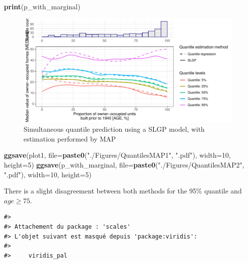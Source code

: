 \documentclass[
]{article}
\newenvironment{Shaded}{\begin{snugshade}}{\end{snugshade}}
\newcommand{\AttributeTok}[1]{\textcolor[rgb]{0.13,0.29,0.53}{#1}}
\newcommand{\DecValTok}[1]{\textcolor[rgb]{0.00,0.00,0.81}{#1}}
\newcommand{\FunctionTok}[1]{\textcolor[rgb]{0.13,0.29,0.53}{\textbf{#1}}}
\newcommand{\NormalTok}[1]{#1}
\newcommand{\StringTok}[1]{\textcolor[rgb]{0.31,0.60,0.02}{#1}}
\begin{document}
\begin{Shaded}
\begin{Highlighting}[]
\FunctionTok{print}\NormalTok{(p\_with\_marginal)}
\end{Highlighting}
\end{Shaded}

\begin{figure}[H]

{\centering \includegraphics{IntroductionSLGP_files/figure-latex/SLGPMCMCplotQuantiles-1} 

}

\caption{Simultaneous quantile prediction using a SLGP model, with estimation performed by MAP}\label{fig:SLGPMCMCplotQuantiles}
\end{figure}

\begin{Shaded}
\begin{Highlighting}[]
\FunctionTok{ggsave}\NormalTok{(plot1, }\AttributeTok{file=}\FunctionTok{paste0}\NormalTok{(}\StringTok{"./Figures/QuantilesMAP1"}\NormalTok{,  }\StringTok{".pdf"}\NormalTok{), }\AttributeTok{width=}\DecValTok{10}\NormalTok{, }\AttributeTok{height=}\DecValTok{5}\NormalTok{)}
\FunctionTok{ggsave}\NormalTok{(p\_with\_marginal, }\AttributeTok{file=}\FunctionTok{paste0}\NormalTok{(}\StringTok{"./Figures/QuantilesMAP2"}\NormalTok{,  }\StringTok{".pdf"}\NormalTok{), }\AttributeTok{width=}\DecValTok{10}\NormalTok{, }\AttributeTok{height=}\DecValTok{5}\NormalTok{)}
\end{Highlighting}
\end{Shaded}

There is a slight disagreement between both methods for the 95\% quantile and \(age \geq 75\).

\begin{verbatim}
#> 
#> Attachement du package : 'scales'
#> L'objet suivant est masqué depuis 'package:viridis':
#> 
#>     viridis_pal
\end{verbatim}
\end{document}

